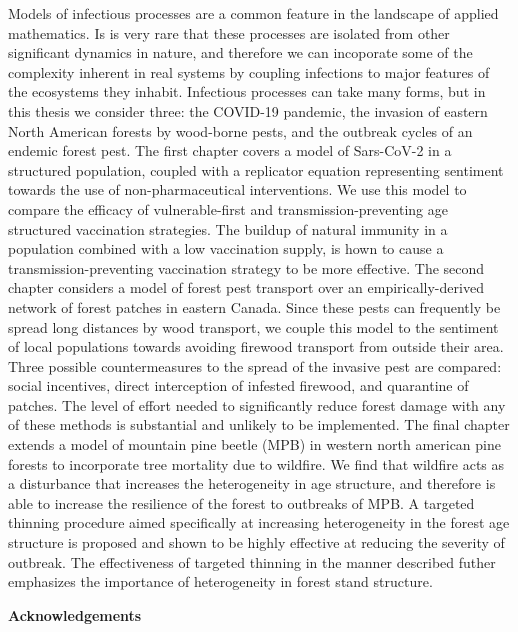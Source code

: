 Models of infectious processes are a common feature in the landscape of applied mathematics. Is is very rare that these processes are isolated from other significant dynamics in nature, and therefore we can incoporate some of the complexity inherent in real systems by coupling infections to major features of the ecosystems they inhabit. Infectious processes can take many forms, but in this thesis we consider three: the COVID-19 pandemic, the invasion of eastern North American forests by wood-borne pests, and the outbreak cycles of an endemic forest pest. The first chapter covers a model of Sars-CoV-2 in a structured population, coupled with a replicator equation representing sentiment towards the use of non-pharmaceutical interventions. We use this model to compare the efficacy of vulnerable-first and transmission-preventing age structured vaccination strategies. The buildup of natural immunity in a population combined with a low vaccination supply, is hown to cause a transmission-preventing vaccination strategy to be more effective. The second chapter considers a model of forest pest transport over an empirically-derived network of forest patches in eastern Canada. Since these pests can frequently be spread long distances by wood transport, we couple this model to the sentiment of local populations towards avoiding firewood transport from outside their area. Three possible countermeasures to the spread of the invasive pest are compared: social incentives, direct interception of infested firewood, and quarantine of patches. The level of effort needed to significantly reduce forest damage with any of these methods is substantial and unlikely to be implemented. The final chapter extends a model of mountain pine beetle (MPB) in western north american pine forests to incorporate tree mortality due to wildfire. We find that wildfire acts as a disturbance that increases the heterogeneity in age structure, and therefore is able to increase the resilience of the forest to outbreaks of MPB. A targeted thinning procedure aimed specifically at increasing heterogeneity in the forest age structure is proposed and shown to be highly effective at reducing the severity of outbreak. The effectiveness of targeted thinning in the manner described futher emphasizes the importance of heterogeneity in forest stand structure.



\cleardoublepage


\begin{center}\textbf{Acknowledgements}\end{center}

